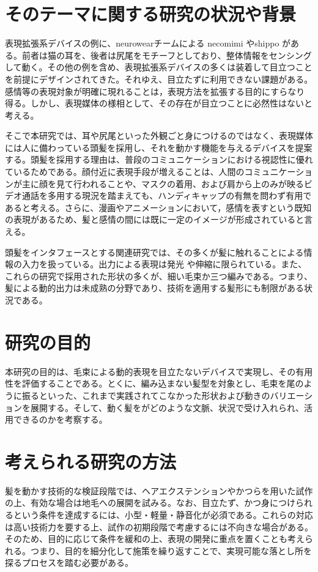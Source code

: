 \documentclass[a4paper]{jsarticle}
\begin{document}
\section{そのテーマに関する研究の状況や背景}
表現拡張系デバイスの例に、neurowearチームによる necomimi \cite{necomimi}やshippo \cite{shippo}がある。前者は猫の耳を、後者は尻尾をモチーフとしており、整体情報をセンシングして動く。その他の例を含め、表現拡張系デバイスの多くは装着して目立つことを前提にデザインされてきた。それゆえ、目立たずに利用できない課題がある。感情等の表現対象が明確に現れることは，表現方法を拡張する目的にすらなり得る。しかし、表現媒体の様相として、その存在が目立つことに必然性はないと考える。

そこで本研究では、耳や尻尾といった外観ごと身につけるのではなく、表現媒体には人に備わっている頭髪を採用し、それを動かす機能を与えるデバイスを提案する。頭髪を採用する理由は、普段のコミュニケーションにおける視認性に優れているためである。顔付近に表現手段が増えることは、人間のコミュニケーションが主に顔を見て行われることや、マスクの着用、および肩から上のみが映るビデオ通話を多用する現況を踏まえても、ハンディキャップの有無を問わず有用であると考える。さらに、漫画やアニメーションにおいて，感情を表すという既知の表現があるため、髪と感情の間には既に一定のイメージが形成されていると言える。

頭髪をインタフェースとする関連研究では、その多くが髪に触れることによる情報の入力を扱っている\cite{smartWig}\cite{Hairware}\cite{HairIO}。出力による表現は発光\cite{LH} \cite{VariWig}や伸縮\cite{HairIO}に限られている。また、これらの研究で採用された形状の多くが、細い毛束か三つ編みである。つまり、髪による動的出力は未成熟の分野であり、技術を適用する髪形にも制限がある状況である。

\section{研究の目的} 
本研究の目的は、毛束による動的表現を目立たないデバイスで実現し、その有用性を評価することである。とくに、編み込まない髪型を対象とし、毛束を尾のように振るといった、これまで実践されてこなかった形状および動きのバリエーションを展開する。そして、動く髪をがどのような文脈、状況で受け入れられ、活用できるのかを考察する。

\section{考えられる研究の方法} 
髪を動かす技術的な検証段階では、ヘアエクステンションやかつらを用いた試作の上、有効な場合は地毛への展開を試みる。なお、目立たず、かつ身につけられるという条件を達成するには、小型・軽量・静音化が必須である。これらの対応は高い技術力を要する上、試作の初期段階で考慮するには不向きな場合がある。そのため、目的に応じて条件を緩和の上、表現の開発に重点を置くことも考えられる。つまり、目的を細分化して施策を繰り返すことで、実現可能な落とし所を探るプロセスを踏む必要がある。
\end{document}

